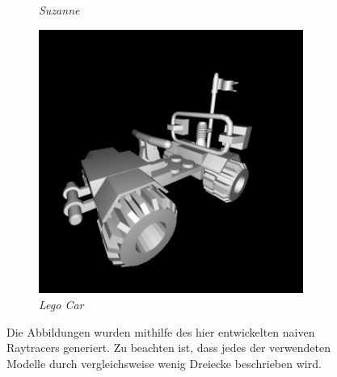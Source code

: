 \documentclass[crop=false]{standalone}
\begin{document}
\begin{figure}[h]
\begin{subfigure}[b]{0.30\textwidth}
          \caption{%
            \textit{Suzanne}
          }
        \end{subfigure}
        \begin{subfigure}[b]{0.30\textwidth}
          \center
          \includegraphics[width=0.95\textwidth]{images/lego_car.png}
          \caption{%
            \textit{Lego Car}
          }
        \end{subfigure}
        \caption{%
          Die Abbildungen wurden mithilfe des hier entwickelten naiven Raytracers generiert.
          Zu beachten ist, dass jedes der verwendeten Modelle durch vergleichsweise wenig Dreiecke beschrieben wird.
        }
        \label{fig:naive-ray-tracing-results}
      \end{figure}
\end{document}
